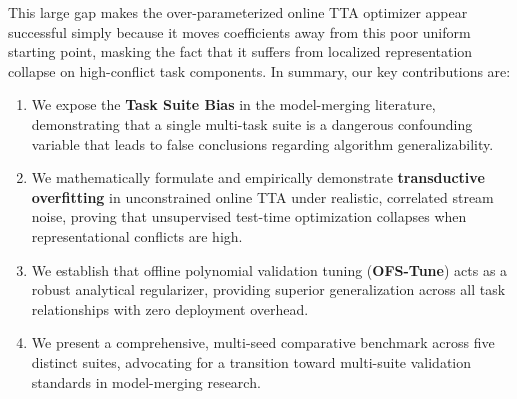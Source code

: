 This large gap makes the over-parameterized online TTA optimizer appear successful simply because it moves coefficients away from this poor uniform starting point, masking the fact that it suffers from localized representation collapse on high-conflict task components.
In summary, our key contributions are:
\begin{enumerate}
    \item We expose the \textbf{Task Suite Bias} in the model-merging literature, demonstrating that a single multi-task suite is a dangerous confounding variable that leads to false conclusions regarding algorithm generalizability.
    \item We mathematically formulate and empirically demonstrate \textbf{transductive overfitting} in unconstrained online TTA under realistic, correlated stream noise, proving that unsupervised test-time optimization collapses when representational conflicts are high.
    \item We establish that offline polynomial validation tuning (\textbf{OFS-Tune}) acts as a robust analytical regularizer, providing superior generalization across all task relationships with zero deployment overhead.
    \item We present a comprehensive, multi-seed comparative benchmark across five distinct suites, advocating for a transition toward multi-suite validation standards in model-merging research.
\end{enumerate}
